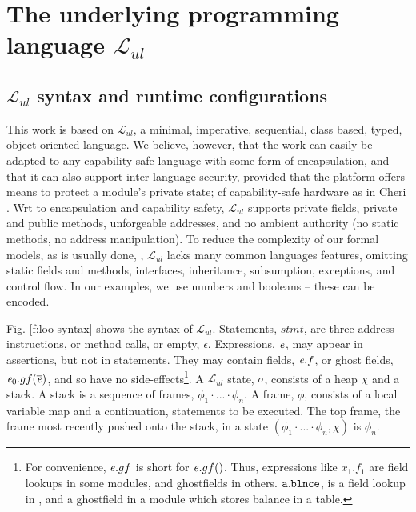 \renewcommand{\LangOO}{\ensuremath{{\mathcal{L}}_{ul}}\xspace }

\section{The underlying programming language \LangOO}  
\label{sect:underlying}

\subsection{\LangOO syntax and runtime configurations}
\label{sub:Loo} 
This work is based on \LangOO, a {minimal}, imperative, sequential,  class based, typed, object-oriented language. 
We believe, however, that the work can easily be adapted to any capability safe language with some form of encapsulation,
and that it can also support inter-language security, provided that the 
platform offers means to protect a module’s private state; cf capability-safe hardware as in Cheri \cite{davis2019cheriabi}.
Wrt to encapsulation and  capability safety,  \LangOO supports private fields, private and public methods, unforgeable addresses, and no ambient authority (no static methods, no address manipulation).
To reduce the complexity of our formal models, as is usually done, \eg \cite{IgaPieWadTOPLAS01,DietlDrossopoulouMueller07a,ParBiePOPL05},  \LangOO lacks many
common languages features, omitting static fields and methods, interfaces,
inheritance, subsumption, exceptions, and control flow.  
{In our examples, we use numbers and booleans -- these can be encoded.}
 
 Fig. \ref{f:loo-syntax} shows the syntax of \LangOO. {Statements, $stmt$, are three-address instructions, or   method calls, or empty, $\epsilon$.}  {Expressions, $\mathit{e}$, may appear in assertions, but not in statements.}
They   may contain fields, $\mathit{e}.f$, or ghost fields, ${\mathit{e}_0.gf(\overline {\mathit{e}})}$, and so have no side-effects\footnote{
{For convenience,   $\mathit{e}.gf$ is short for $\mathit{e}.gf()$. Thus, expressions  like $x_1.f_1$ are field lookups in some modules, and   ghostfields in others. 
\Eg  $\mbox{\normalfont{\texttt{a}}}.\mbox{\normalfont{\texttt{\mbox{\normalfont{\texttt{blnce}}}}}}$,    is a field lookup in \ModA, %
and a ghostfield  in a module which stores balance in a table.}}.
 A \LangOO state, $\sigma$,  consists of a  heap $\chi$ and a stack. 
{A stack  is a sequence of frames, $\phi_1\!\cdot\!...\!\cdot\! \phi_n$.}
A  frame, $\phi$, consists of a local variable map and a continuation,  %
statements to be executed.
The top frame, \ie  the frame most recently pushed onto the stack,  in a state $(\phi_1\!\cdot\!...\!\cdot\! \phi_n, \chi)$ is $\phi_n$.




